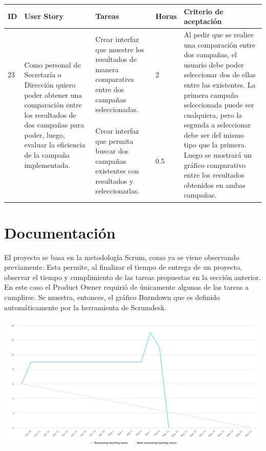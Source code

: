 \documentclass[a4paper, 11pt]{article}
\begin{document}
\begin{table}[H]
\centering
\begin{tabular}{ | p{0.5cm} | p{4cm} | p{5cm} | p{0.85cm} | p{5cm} |}
\hline 
ID & User Story & Tareas & Horas & Criterio de aceptación \\ \hline \hline

23 & \multirow{2}{4cm}{Como personal de Secretaría o Dirección quiero poder obtener una comparación entre los resultados de dos campañas para poder, luego, evaluar la eficiencia de la campaña implementada.} & Crear interfaz que muestre los resultados de manera comparativa entre dos campañas seleccionadas. & 2 & \multirow{2}{5cm}{Al pedir que se realice una comparación entre dos campañas, el usuario debe poder seleccionar dos de ellas entre las existentes. La primera campaña seleccionada puede ser cualquiera, pero la segunda a seleccionar debe ser del mismo tipo que la primera. Luego se mostrará un gráfico comparativo entre los resultados obtenidos en ambas campañas. } \\[3cm] \cline{3-4}
& & Crear interfaz que permita buscar dos campañas existentes con resultados y seleccionarlas. & 0.5 & \\[3cm] \hline

\end{tabular}
\end{table}

\newpage

\section{Documentación}
El proyecto se basa en la metodología Scrum, como ya se viene observando previamente. Esta permite, al finalizar el tiempo de entrega de un proyecto, observar el tiempo y cumplimiento de las tareas propuestas en la sección anterior. En este caso el Product Owner requirió de únicamente algunas de las tareas a cumplirse. Se muestra, entonces, el gráfico Burndown que es definido automáticamente por la herramienta de Scrumdesk.

\centerline{\includegraphics[width=1\textwidth]{./sprint1_burndown.png}}
\end{document}
